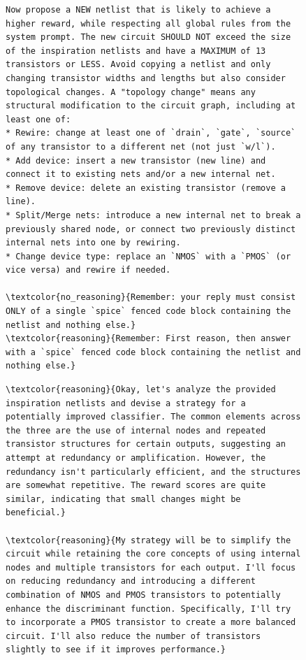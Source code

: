 \documentclass[sigconf,pbalance]{acmart_modified}
\begin{document}
\begin{figure}
\begin{minipage}[t]{0.54\textwidth}
\begin{prompt}
\begin{Verbatim}[breaklines=true,breaksymbolleft={},commandchars=\\\{\}]
Now propose a NEW netlist that is likely to achieve a higher reward, while respecting all global rules from the system prompt. The new circuit SHOULD NOT exceed the size of the inspiration netlists and have a MAXIMUM of 13 transistors or LESS. Avoid copying a netlist and only changing transistor widths and lengths but also consider topological changes. A "topology change" means any structural modification to the circuit graph, including at least one of:
* Rewire: change at least one of `drain`, `gate`, `source` of any transistor to a different net (not just `w/l`).
* Add device: insert a new transistor (new line) and connect it to existing nets and/or a new internal net.
* Remove device: delete an existing transistor (remove a line).
* Split/Merge nets: introduce a new internal net to break a previously shared node, or connect two previously distinct internal nets into one by rewiring.
* Change device type: replace an `NMOS` with a `PMOS` (or vice versa) and rewire if needed.

\textcolor{no_reasoning}{Remember: your reply must consist ONLY of a single `spice` fenced code block containing the netlist and nothing else.}
\textcolor{reasoning}{Remember: First reason, then answer with a `spice` fenced code block containing the netlist and nothing else.}
\end{Verbatim}
\end{prompt}
\end{minipage}\hfill
\begin{minipage}[t]{0.44\textwidth}
\vspace{0pt}
\begin{prompt}
    \fontsize{6pt}{6pt}\selectfont
    \ttfamily
    \begin{Verbatim}[breaklines=true,breaksymbolleft={},commandchars=\\\{\}]
\textcolor{reasoning}{Okay, let's analyze the provided inspiration netlists and devise a strategy for a potentially improved classifier. The common elements across the three are the use of internal nodes and repeated transistor structures for certain outputs, suggesting an attempt at redundancy or amplification. However, the redundancy isn't particularly efficient, and the structures are somewhat repetitive. The reward scores are quite similar, indicating that small changes might be beneficial.}

\textcolor{reasoning}{My strategy will be to simplify the circuit while retaining the core concepts of using internal nodes and multiple transistors for each output. I'll focus on reducing redundancy and introducing a different combination of NMOS and PMOS transistors to potentially enhance the discriminant function. Specifically, I'll try to incorporate a PMOS transistor to create a more balanced circuit. I'll also reduce the number of transistors slightly to see if it improves performance.}


\end{Verbatim}
\end{prompt}
\end{minipage}
\end{figure}
\end{document}
